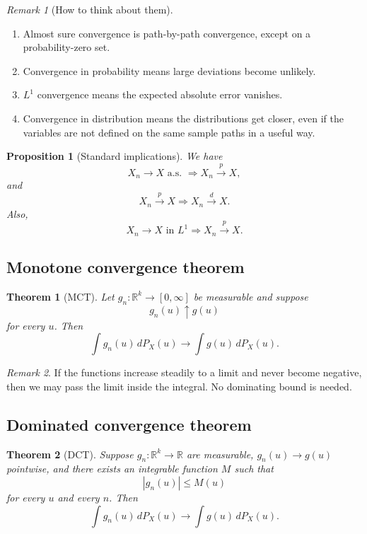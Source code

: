 \documentclass[11pt]{article}
\newtheorem{theorem}{Theorem}[section]
\newtheorem{proposition}{Proposition}[section]
\theoremstyle{remark}
\newtheorem{remark}{Remark}[section]
\newcommand{\R}{\mathbb{R}}
\newcommand{\1}{\mathbbm{1}}
\begin{document}
\begin{remark}[How to think about them]
\begin{enumerate}[label=(\roman*)]
  \item Almost sure convergence is path-by-path convergence, except on a probability-zero set.
  \item Convergence in probability means large deviations become unlikely.
  \item \(L^1\) convergence means the expected absolute error vanishes.
  \item Convergence in distribution means the distributions get closer, even if the variables are not defined on the same sample paths in a useful way.
\end{enumerate}
\end{remark}

\begin{proposition}[Standard implications]
We have
\[
  X_n \to X \text{ a.s. } \Rightarrow X_n \xrightarrow{p} X,
\]
and
\[
  X_n \xrightarrow{p} X \Rightarrow X_n \xrightarrow{d} X.
\]
Also,
\[
  X_n \to X \text{ in } L^1 \Rightarrow X_n \xrightarrow{p} X.
\]
\end{proposition}

\subsection{Monotone convergence theorem}

\begin{theorem}[MCT]
Let \(g_n:\R^k \to [0,\infty]\) be measurable and suppose
\[
  g_n(u)\uparrow g(u)
\]
for every \(u\). Then
\[
  \int g_n(u)\,dP_X(u) \to \int g(u)\,dP_X(u).
\]
\end{theorem}

\begin{remark}
If the functions increase steadily to a limit and never become negative, then we may pass the limit inside the integral. No dominating bound is needed.
\end{remark}

\subsection{Dominated convergence theorem}

\begin{theorem}[DCT]
Suppose \(g_n:\R^k \to \R\) are measurable, \(g_n(u)\to g(u)\) pointwise, and there exists an integrable function \(M\) such that
\[
  |g_n(u)| \le M(u)
\]
for every \(u\) and every \(n\). Then
\[
  \int g_n(u)\,dP_X(u) \to \int g(u)\,dP_X(u).
\]
\end{theorem}
\end{document}
